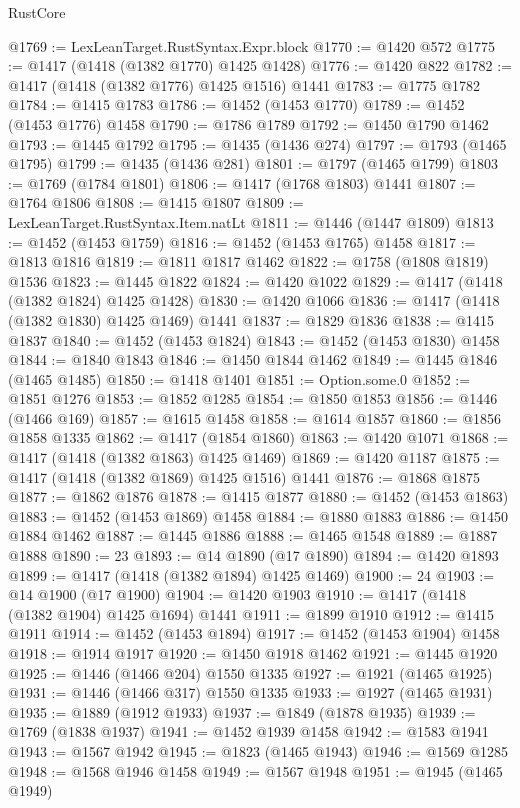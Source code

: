 \begin{lexlean}{RustCore}
\begin{coremodule}
@1769 := LexLeanTarget.RustSyntax.Expr.block
@1770 := @1420 @572
@1775 := @1417 (@1418 (@1382 @1770) @1425 @1428)
@1776 := @1420 @822
@1782 := @1417 (@1418 (@1382 @1776) @1425 @1516) @1441
@1783 := @1775 @1782
@1784 := @1415 @1783
@1786 := @1452 (@1453 @1770)
@1789 := @1452 (@1453 @1776) @1458
@1790 := @1786 @1789
@1792 := @1450 @1790 @1462
@1793 := @1445 @1792
@1795 := @1435 (@1436 @274)
@1797 := @1793 (@1465 @1795)
@1799 := @1435 (@1436 @281)
@1801 := @1797 (@1465 @1799)
@1803 := @1769 (@1784 @1801)
@1806 := @1417 (@1768 @1803) @1441
@1807 := @1764 @1806
@1808 := @1415 @1807
@1809 := LexLeanTarget.RustSyntax.Item.natLt
@1811 := @1446 (@1447 @1809)
@1813 := @1452 (@1453 @1759)
@1816 := @1452 (@1453 @1765) @1458
@1817 := @1813 @1816
@1819 := @1811 @1817 @1462
@1822 := @1758 (@1808 @1819) @1536
@1823 := @1445 @1822
@1824 := @1420 @1022
@1829 := @1417 (@1418 (@1382 @1824) @1425 @1428)
@1830 := @1420 @1066
@1836 := @1417 (@1418 (@1382 @1830) @1425 @1469) @1441
@1837 := @1829 @1836
@1838 := @1415 @1837
@1840 := @1452 (@1453 @1824)
@1843 := @1452 (@1453 @1830) @1458
@1844 := @1840 @1843
@1846 := @1450 @1844 @1462
@1849 := @1445 @1846 (@1465 @1485)
@1850 := @1418 @1401
@1851 := Option.some.{0}
@1852 := @1851 @1276
@1853 := @1852 @1285
@1854 := @1850 @1853
@1856 := @1446 (@1466 @169)
@1857 := @1615 @1458
@1858 := @1614 @1857
@1860 := @1856 @1858 @1335
@1862 := @1417 (@1854 @1860)
@1863 := @1420 @1071
@1868 := @1417 (@1418 (@1382 @1863) @1425 @1469)
@1869 := @1420 @1187
@1875 := @1417 (@1418 (@1382 @1869) @1425 @1516) @1441
@1876 := @1868 @1875
@1877 := @1862 @1876
@1878 := @1415 @1877
@1880 := @1452 (@1453 @1863)
@1883 := @1452 (@1453 @1869) @1458
@1884 := @1880 @1883
@1886 := @1450 @1884 @1462
@1887 := @1445 @1886
@1888 := @1465 @1548
@1889 := @1887 @1888
@1890 := 23
@1893 := @14 @1890 (@17 @1890)
@1894 := @1420 @1893
@1899 := @1417 (@1418 (@1382 @1894) @1425 @1469)
@1900 := 24
@1903 := @14 @1900 (@17 @1900)
@1904 := @1420 @1903
@1910 := @1417 (@1418 (@1382 @1904) @1425 @1694) @1441
@1911 := @1899 @1910
@1912 := @1415 @1911
@1914 := @1452 (@1453 @1894)
@1917 := @1452 (@1453 @1904) @1458
@1918 := @1914 @1917
@1920 := @1450 @1918 @1462
@1921 := @1445 @1920
@1925 := @1446 (@1466 @204) @1550 @1335
@1927 := @1921 (@1465 @1925)
@1931 := @1446 (@1466 @317) @1550 @1335
@1933 := @1927 (@1465 @1931)
@1935 := @1889 (@1912 @1933)
@1937 := @1849 (@1878 @1935)
@1939 := @1769 (@1838 @1937)
@1941 := @1452 @1939 @1458
@1942 := @1583 @1941
@1943 := @1567 @1942
@1945 := @1823 (@1465 @1943)
@1946 := @1569 @1285
@1948 := @1568 @1946 @1458
@1949 := @1567 @1948
@1951 := @1945 (@1465 @1949)

\end{coremodule}
\end{lexlean}
